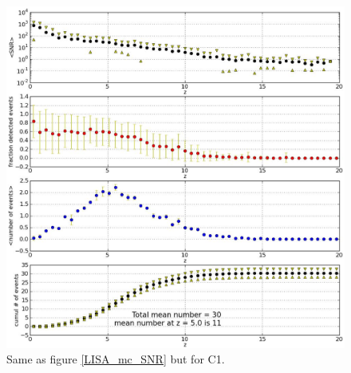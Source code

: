 \documentclass{iopart}
\begin{document}
\begin{figure}[H]
\center
   \includegraphics[width=1\textwidth]{FigSMBHPhenomAEI/C1_mc_SNRs}
\caption{Same as figure \ref{LISA_mc_SNR} but for C1.
\label{C1_mc_SNR} } 
\end{figure}



\end{document}
